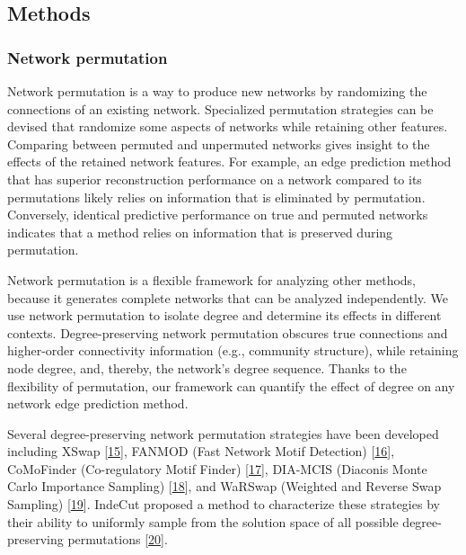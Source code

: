 \hypertarget{methods}{%
\subsection{Methods}\label{methods}}

\hypertarget{network-permutation}{%
\subsubsection{Network permutation}\label{network-permutation}}

Network permutation is a way to produce new networks by randomizing the connections of an existing network.
Specialized permutation strategies can be devised that randomize some aspects of networks while retaining other features.
Comparing between permuted and unpermuted networks gives insight to the effects of the retained network features.
For example, an edge prediction method that has superior reconstruction performance on a network compared to its permutations likely relies on information that is eliminated by permutation.
Conversely, identical predictive performance on true and permuted networks indicates that a method relies on information that is preserved during permutation.

Network permutation is a flexible framework for analyzing other methods, because it generates complete networks that can be analyzed independently.
We use network permutation to isolate degree and determine its effects in different contexts.
Degree-preserving network permutation obscures true connections and higher-order connectivity information (e.g., community structure), while retaining node degree, and, thereby, the network's degree sequence.
Thanks to the flexibility of permutation, our framework can quantify the effect of degree on any network edge prediction method.

Several degree-preserving network permutation strategies have been developed including
XSwap {[}\protect\hyperlink{ref-iKOIEzQ9}{15}{]},
FANMOD (Fast Network Motif Detection) {[}\protect\hyperlink{ref-uOEal8WK}{16}{]},
CoMoFinder (Co-regulatory Motif Finder) {[}\protect\hyperlink{ref-3PpbLGzM}{17}{]},
DIA-MCIS (Diaconis Monte Carlo Importance Sampling) {[}\protect\hyperlink{ref-MReKXrBA}{18}{]},
and WaRSwap (Weighted and Reverse Swap Sampling) {[}\protect\hyperlink{ref-sZgRtYru}{19}{]}.
IndeCut proposed a method to characterize these strategies by their ability to uniformly sample from the solution space of all possible degree-preserving permutations {[}\protect\hyperlink{ref-TFMmV4Z2}{20}{]}.

